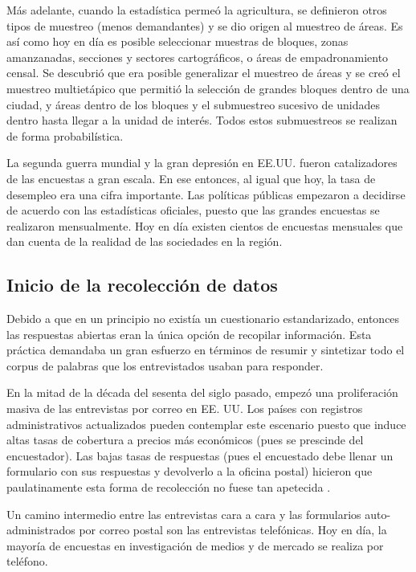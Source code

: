 \documentclass[
  12pt,
  spanish,
]{book}
\begin{document}
Más adelante, cuando la estadística permeó la agricultura, se definieron otros tipos de muestreo (menos demandantes) y se dio origen al muestreo de áreas. Es así como hoy en día es posible seleccionar muestras de bloques, zonas amanzanadas, secciones y sectores cartográficos, o áreas de empadronamiento censal. Se descubrió que era posible generalizar el muestreo de áreas y se creó el muestreo multietápico que permitió la selección de grandes bloques dentro de una ciudad, y áreas dentro de los bloques y el submuestreo sucesivo de unidades dentro hasta llegar a la unidad de interés. Todos estos submuestreos se realizan de forma probabilística.

La segunda guerra mundial y la gran depresión en EE.UU. fueron catalizadores de las encuestas a gran escala. En ese entonces, al igual que hoy, la tasa de desempleo era una cifra importante. Las políticas públicas empezaron a decidirse de acuerdo con las estadísticas oficiales, puesto que las grandes encuestas se realizaron mensualmente. Hoy en día existen cientos de encuestas mensuales que dan cuenta de la realidad de las sociedades en la región.

\hypertarget{inicio-de-la-recolecciuxf3n-de-datos}{%
\subsection*{Inicio de la recolección de datos}\label{inicio-de-la-recolecciuxf3n-de-datos}}

Debido a que en un principio no existía un cuestionario estandarizado, entonces las respuestas abiertas eran la única opción de recopilar información. Esta práctica demandaba un gran esfuerzo en términos de resumir y sintetizar todo el corpus de palabras que los entrevistados usaban para responder.

En la mitad de la década del sesenta del siglo pasado, empezó una proliferación masiva de las entrevistas por correo en EE. UU. Los países con registros administrativos actualizados pueden contemplar este escenario puesto que induce altas tasas de cobertura a precios más económicos (pues se prescinde del encuestador). Las bajas tasas de respuestas (pues el encuestado debe llenar un formulario con sus respuestas y devolverlo a la oficina postal) hicieron que paulatinamente esta forma de recolección no fuese tan apetecida \citep{Groves_Fowler_Couper_Lepkowski_Singer_Tourangeau_2009}.

Un camino intermedio entre las entrevistas cara a cara y las formularios auto-administrados por correo postal son las entrevistas telefónicas. Hoy en día, la mayoría de encuestas en investigación de medios y de mercado se realiza por teléfono.
\end{document}
